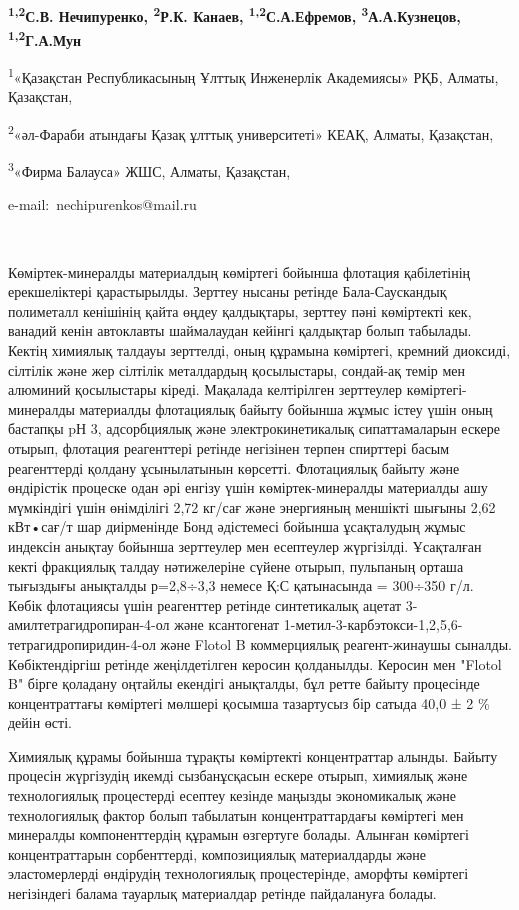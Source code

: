 ~

{\bfseries \textsuperscript{1,2}С.В. Нечипуренко, \textsuperscript{2}Р.К.
Канаев, \textsuperscript{1,2}С.А.Ефремов,
\textsuperscript{3}А.А.Кузнецов, \textsuperscript{1,2}Г.А.Мун}

\textsuperscript{1}«Қазақстан Республикасының Ұлттық Инженерлік
Академиясы» РҚБ, Алматы, Қазақстан,

\textsuperscript{2}«әл-Фараби атындағы Қазақ ұлттық университеті» КЕАҚ,
Алматы, Қазақстан,

\textsuperscript{3}«Фирма Балауса» ЖШС, Алматы, Қазақстан,

e-mail:~nechipurenkos@mail.ru

~

Көміртек-минералды материалдың көміртегі бойынша флотация қабілетінің
ерекшеліктері қарастырылды. Зерттеу нысаны ретінде Бала-Саускандық
полиметалл кенішінің қайта өңдеу қалдықтары, зерттеу пәні көміртекті
кек, ванадий кенін автоклавты шаймалаудан кейінгі қалдықтар болып
табылады. Кектің химиялық талдауы зерттелді, оның құрамына көміртегі,
кремний диоксиді, сілтілік және жер сілтілік металдардың қосылыстары,
сондай-ақ темір мен алюминий қосылыстары кіреді. Мақалада келтірілген
зерттеулер көміртегі-минералды материалды флотациялық байыту бойынша
жұмыс істеу үшін оның бастапқы pН 3, адсорбциялық және
электрокинетикалық сипаттамаларын ескере отырып, флотация реагенттері
ретінде негізінен терпен спирттері басым реагенттерді қолдану
ұсынылатынын көрсетті. Флотациялық байыту және өндірістік процеске одан
әрі енгізу үшін көміртек-минералды материалды ашу мүмкіндігі үшін
өнімділігі 2,72 кг/сағ және энергияның меншікті шығыны 2,62 кВт•сағ/т
шар диірменінде Бонд әдістемесі бойынша ұсақталудың жұмыс индексін
анықтау бойынша зерттеулер мен есептеулер жүргізілді. Ұсақталған кекті
фракциялық талдау нәтижелеріне сүйене отырып, пульпаның орташа тығыздығы
анықталды р=2,8÷3,3 немесе Қ:С қатынасында = 300÷350 г/л. Көбік
флотациясы үшін реагенттер ретінде синтетикалық ацетат
3-амилтетрагидропиран-4-ол және ксантогенат
1-метил-3-карбэтокси-1,2,5,6-тетрагидропиридин-4-ол және Flotol B
коммерциялық реагент-жинаушы сыналды. Көбіктендіргіш ретінде
жеңілдетілген керосин қолданылды. Керосин мен "Flotol B" бірге қоладану
оңтайлы екендігі анықталды, бұл ретте байыту процесінде концентраттағы
көміртегі мөлшері қосымша тазартусыз бір сатыда 40,0 ± 2 \% дейін өсті.

Химиялық құрамы бойынша тұрақты көміртекті концентраттар алынды. Байыту
процесін жүргізудің икемді сызбанұсқасын ескере отырып, химиялық және
технологиялық процестерді есептеу кезінде маңызды экономикалық және
технологиялық фактор болып табылатын концентраттардағы көміртегі мен
минералды компоненттердің құрамын өзгертуге болады. Алынған көміртегі
концентраттарын сорбенттерді, композициялық материалдарды және
эластомерлерді өндірудің технологиялық процестерінде, аморфты көміртегі
негізіндегі балама тауарлық материалдар ретінде пайдалануға болады.

